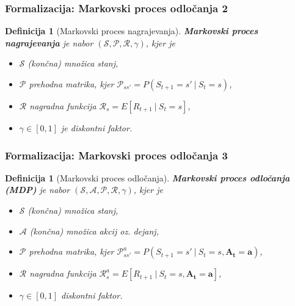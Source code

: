 \documentclass{beamer}    %
\newtheorem{definicija}[izrek]{Definicija}
\begin{document}
\begin{frame}
    \frametitle{Formalizacija: Markovski proces odločanja 2}
    \begin{definicija}[Markovski proces nagrajevanja]
        \textbf{Markovski proces nagrajevanja} je nabor 
        $(\mathcal{S}, \mathcal{P}, \mathcal{R}, \gamma)$, kjer je
        \begin{itemize}
            \item $\mathcal{S}$ (končna) množica stanj,
            \item $\mathcal{P}$ prehodna matrika, kjer $\mathcal{P}_{ss'} = P(S_{t+1} = s'~|~S_{t} = s)$,
            \item $\mathcal{R}$ nagradna funkcija $\mathcal{R}_s = E[R_{t+1}~|~S_{t} = s]$,
            \item $\gamma \in [0, 1]$ je diskontni faktor.
        \end{itemize}
    \end{definicija}
\end{frame}


\begin{frame}
    \frametitle{Formalizacija: Markovski proces odločanja 3}
    \begin{definicija}[Markovski proces odločanja]
        \textbf{Markovski proces odločanja (MDP)} je nabor 
        $(\mathcal{S}, \mathcal{A}, \mathcal{P}, \mathcal{R}, \gamma)$, kjer je
        \begin{itemize}
            \item $\mathcal{S}$ (končna) množica stanj,
            \item $\mathcal{A}$ (končna) množica akcij oz. dejanj,
            \item $\mathcal{P}$ prehodna matrika, kjer $\mathcal{P}_{ss'}^a = P(S_{t+1} = s'~|~S_{t} = s,
                    \mathbf{A_t = a})$,
            \item $\mathcal{R}$ nagradna funkcija $\mathcal{R}_s^a = E[R_{t+1}~|~S_{t} = s, 
                    \mathbf{A_t = a}]$,
            \item $\gamma \in [0, 1]$ diskontni faktor.
        \end{itemize}
    \end{definicija}
\end{frame}
\end{document}
